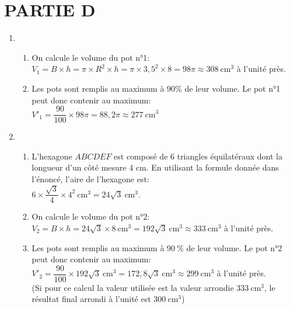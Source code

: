  \section*{\hspace{20mm}\textbf{PARTIE D}}
 \begin{enumerate}
    \item 
    \begin{enumerate}
        \item On calcule le volume du pot n°1:\\ $V_1=B\times h=\pi\times  R^2\times h=\pi\times3,5^2\times8= 98\pi\approx308~\text{cm}^3$ à l'unité près.
        \item Les pots sont remplis au maximum à $90\%$ de leur volume. Le pot n°1 peut donc contenir au maximum:\\$V'_1=\dfrac{90}{100}\times 98\pi=88,2\pi\approx277~\text{cm}^3$
    \end{enumerate}
    \item
    \begin{enumerate}
        \item L'hexagone $ABCDEF$ est composé de 6 triangles équilatéraux dont la longueur d'un côté mesure 4 cm. En utilisant la formule donnée dans l'énoncé, l'aire de l'hexagone est:\\ $6\times \dfrac{\sqrt{3}}{4}\times 4^2~\text{cm}^3= 24\sqrt{3}~\text{cm}^3$.
        
        \item On calcule le volume du pot n°2:\\$V_2=B\times h= 24\sqrt{3}\times8~\text{cm}^3=192\sqrt{3}~\text{cm}^3\approx333~\text{cm}^3$ à l'unité près.
        \item Les pots sont remplis au maximum à $90~\%$ de leur volume. Le pot n°2 peut donc contenir au maximum:\\$V'_2=\dfrac{90}{100}\times 192\sqrt{3}~\text{cm}^3=172,8\sqrt{3}~\text{cm}^3\approx299~\text{cm}^3$ à l'unité près.\\(Si pour ce calcul la valeur utilisée est la valeur arrondie $333~\text{cm}^3$, le résultat final arrondi à l'unité est $300~\text{cm}^3$)
        \end{enumerate}
\end{enumerate}        